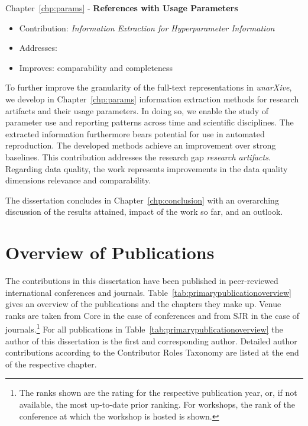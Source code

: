 Chapter~\ref{chp:params} - \textbf{References with Usage Parameters}
\begin{itemize}
    \setlength\itemsep{-0.5em}
    \item Contribution: \textit{Information Extraction for Hyperparameter Information}
    \item Addresses: 
    \item Improves: comparability and completeness
\end{itemize}
To further improve the granularity of the full-text representations in \emph{unarXive}, we develop in Chapter~\ref{chp:params} information extraction methods for research artifacts and their usage parameters. In doing so, we enable the study of parameter use and reporting patterns across time and scientific disciplines. The extracted information furthermore bears potential for use in automated reproduction. The developed methods achieve an improvement over strong baselines.
This contribution addresses the research gap \emph{research artifacts}.
Regarding data quality, the work represents improvements %
in the data quality dimensions relevance and comparability.

The dissertation concludes in Chapter~\ref{chp:conclusion} with an overarching discussion of the results attained, impact of the work so far, and an outlook.

\section{Overview of Publications}

The contributions in this dissertation have been published in peer-reviewed international conferences and journals. Table~\ref{tab:primarypublicationoverview} gives an overview of the publications and the chapters they make up. Venue ranks are taken from Core in the case of conferences and from SJR in the case of journals.\footnote{The ranks shown are the rating for the respective publication year, or, if not available, the most up-to-date prior ranking. For workshops, the rank of the conference at which the workshop is hosted is shown.} For all publications in Table~\ref{tab:primarypublicationoverview} the author of this dissertation is the first and corresponding author. Detailed author contributions according to the Contributor Roles Taxonomy are listed at the end of the respective chapter.


